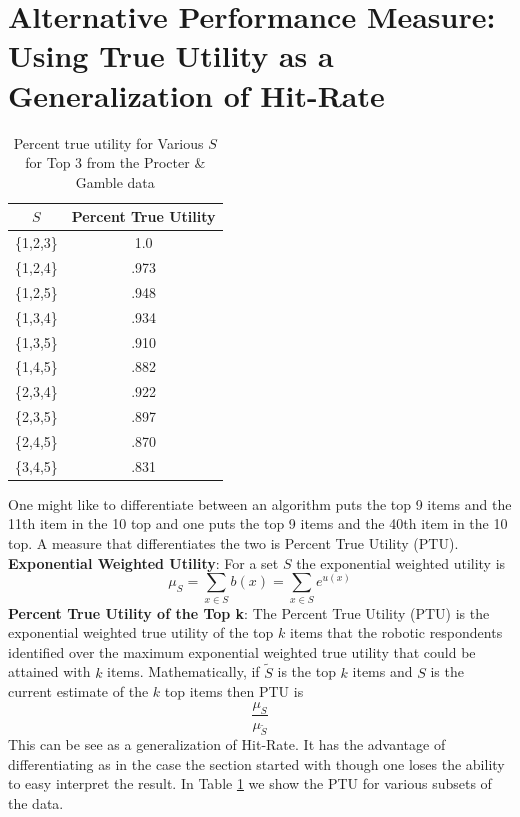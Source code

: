 \documentclass[nonblindrev]{informs3}
\begin{document}
\section{Alternative Performance Measure: Using True Utility as a Generalization of Hit-Rate}
\begin{table}
\begin{center}
\begin{tabular}{c | c }
$S$& Percent True Utility \\
\hline
\{1,2,3\}& 1.0 \\
\{1,2,4\}&.973 \\
\{1,2,5\}&.948 \\
\{1,3,4\}&.934 \\
\{1,3,5\}&.910 \\
\{1,4,5\}&.882 \\
\{2,3,4\}&.922 \\
\{2,3,5\}&.897 \\
\{2,4,5\}&.870 \\
\{3,4,5\}&.831 \\
\hline
\end{tabular}
\end{center}
\caption{Percent true utility for Various $S$ for Top 3 from the Procter \& Gamble data}
\label{table:PTU}
\end{table}
One might like to differentiate between an algorithm puts the top 9 items and the 11th item in the 10 top and one puts the top 9 items and the 40th item in the 10 top. A measure that differentiates the two is Percent True Utility (PTU). \\
\textbf{Exponential Weighted Utility}: For a set $S$ the exponential weighted utility is \[\mu_S=\sum_{x \in S}b(x)=\sum_{x \in S}e^{u(x)}\]
\textbf{Percent True Utility of the Top k}: The Percent True Utility (PTU) is the exponential weighted true utility of the top $k$ items that the robotic respondents identified over the maximum exponential weighted true utility that could be attained with $k$ items. Mathematically, if $\tilde{S}$ is the top $k$ items and $S$ is the current estimate of the $k$ top items then PTU is 
\[
\frac{\mu_S}{\mu_{\tilde{S}}}
\]
This can be see as a generalization of Hit-Rate. It has the advantage of differentiating as in the case the section started with though one loses the ability to easy interpret the result. In Table \ref{table:PTU} we show the PTU for various subsets of the data.
\end{document}
